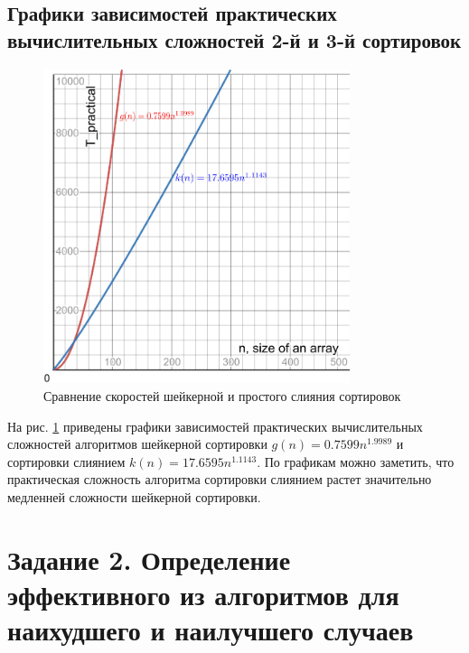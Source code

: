 \documentclass[a4paper, 14pt]{extarticle}
\begin{document}
\subsection{Графики зависимостей практических вычислительных сложностей 2-й и 3-й сортировок}
\begin{figure}[htpb]
  \centering
  \includegraphics[width=0.8\textwidth]{pictures/second_comp_graph_tex.png}
  \caption{Сравнение скоростей шейкерной и простого слияния сортировок}
  \label{fig:graph_second}
\end{figure}
На рис. \ref{fig:graph_second} приведены графики зависимостей практических
вычислительных сложностей алгоритмов
шейкерной сортировки $g(n) = 0.7599n^{1.9989}$ и
сортировки слиянием $k(n) = 17.6595n^{1.1143}$.
По графикам можно заметить, что практическая сложность алгоритма сортировки
слиянием растет значительно медленней сложности шейкерной сортировки.
\newpage
\section{Задание 2. Определение эффективного из алгоритмов для наихудшего и
наилучшего случаев}
\end{document}
